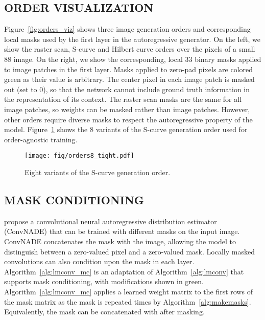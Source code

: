 \documentclass[letterpaper]{article}
\begin{document}
\subsection{ORDER VISUALIZATION}
\vspace{-2mm}
\label{sec:mask_viz}
Figure~\ref{fig:orders_viz} shows three image generation orders and corresponding local masks used by the first \ours{} layer in the autoregressive generator. On the left, we show the raster scan, S-curve and Hilbert curve orders over the pixels of a small 88 image. On the right, we show the corresponding, local 33 binary masks applied to image patches in the first layer. Masks applied to zero-pad pixels are colored green as their value is arbitrary. The center pixel in each image patch is masked out (set to 0), so that the network cannot include ground truth information in the representation of its context. The raster scan masks are the same for all image patches, so weights can be masked rather than image patches. However, other orders require diverse masks to respect the autoregressive property of the model. Figure~\ref{fig:variants} shows the 8 variants of the S-curve generation order used for order-agnostic training.

\begin{figure}[bh]
    \centering
    \texttt{[image: fig/orders8\_tight.pdf]}
    \caption{Eight variants of the S-curve generation order.}
    \label{fig:variants}
\end{figure}

\subsection{MASK CONDITIONING}
\vspace{-2mm}
\cite{JMLR:v17:16-272} propose a convolutional neural autoregressive distribution estimator (ConvNADE) that can be trained with different masks on the input image. ConvNADE concatenates the mask with the image, allowing the model to distinguish between a zero-valued pixel and a zero-valued mask. Locally masked convolutions can also condition upon the mask in each layer. Algorithm~\ref{alg:lmconv_mc} is an adaptation of Algorithm~\ref{alg:lmconv} that supports mask conditioning, with modifications shown in green. Algorithm~\ref{alg:lmconv_mc} applies a learned weight matrix  to the first  rows of the mask matrix as the mask is repeated  times by Algorithm~\ref{alg:makemasks}. Equivalently, the mask  can be concatenated with  after masking.
\end{document}
